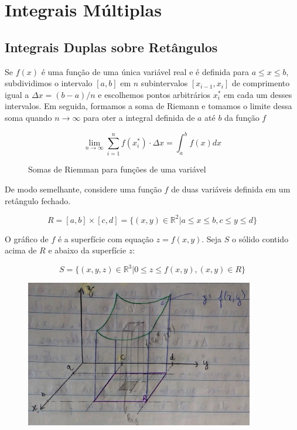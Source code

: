 \chapter{Integrais Múltiplas}

\section{Integrais Duplas sobre Retângulos}

Se $f(x)$ é uma função de uma única variável real e é definida para $a \le x \le b$, subdividimos o intervalo $[a,b]$ em $n$ subintervalos $[x_{i-1},x_i]$ de comprimento igual a $\Delta x = (b-a)/n$ e escolhemos pontos arbitrários $x_i^{*}$ em cada um desses intervalos. Em seguida, formamos a soma de Riemann e tomamos o limite dessa soma quando $n \rightarrow \infty$ para oter a integral definida de $a$ até $b$ da função $f$

\begin{equation}
\lim_{n \rightarrow \infty} \sum_{i=1}^n f(x_i^*) \cdot \Delta x = \int_a^b f(x) dx
\end{equation}

\begin{figure}[!h]
 \centering
 
 \caption{Somas de Riemman para funções de uma variável}
\end{figure}

De modo semelhante, considere uma função $f$ de duas variáveis definida em um retângulo fechado.

$$R = [a,b] \times [c,d] = \{ (x,y) \in \mathbb{R}^2 | a \le x \le b, c \le y \le d \} $$

O gráfico de $f$ é a superfície com equação $z = f(x,y)$. Seja $S$ o sólido contido acima de $R$ e abaixo da superfície $z$:

$$ S = \{ (x,y,z) \in  \mathbb{R}^3 | 0 \le z \le f(x,y), (x,y) \in R \} $$

\begin{figure}[!h]
 \centering
 \includegraphics[width=10cm]{Pictures/graph2.jpg}
\end{figure}

